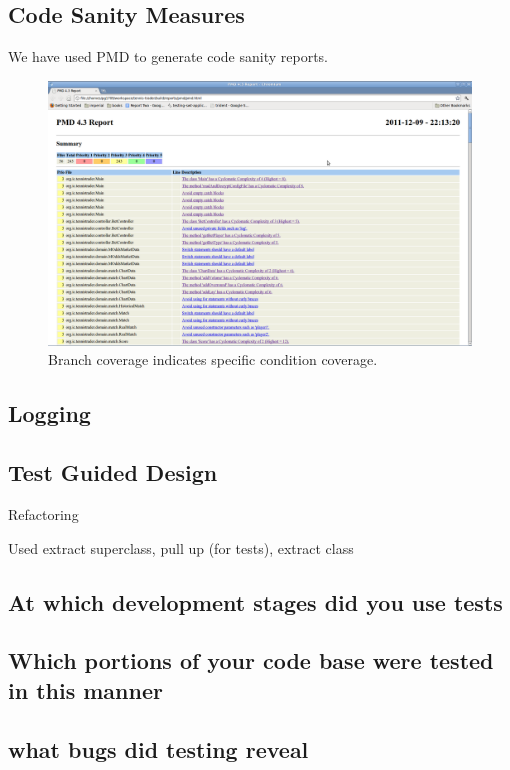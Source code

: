 \documentclass[10pt]{article}
\begin{document}
\subsection{Code Sanity Measures}

We have used PMD to generate code sanity reports.

\begin{figure}[ht]
\centering
\includegraphics[bb=0 0 1680 1050, scale = 0.2]{pmd.png}
\caption{Branch coverage indicates specific condition coverage.}
\end{figure}

\subsection{Logging}

\subsection{Test Guided Design}
Refactoring

Used extract superclass, pull up (for tests), extract class

\subsection{At which development stages did you use tests}

\subsection{Which portions of your code base were tested in this manner}

\subsection{what bugs did testing reveal}
\end{document}
